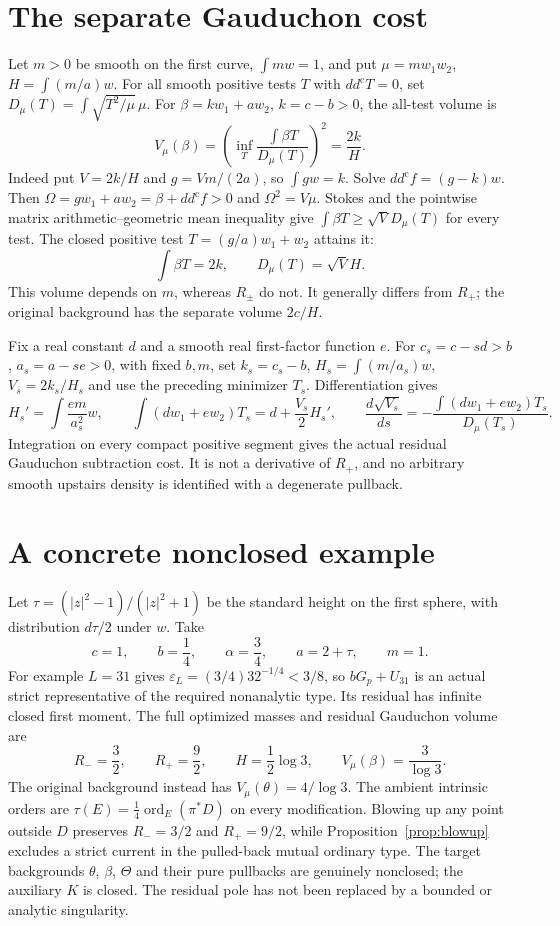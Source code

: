 \documentclass[11pt]{article}
\theoremstyle{remark}
\newcommand{\ddc}{dd^{\mathrm c}}
\begin{document}
\section{The separate Gauduchon cost}
Let $m>0$ be smooth on the first curve, $\int mw=1$, and put
$\mu=mw_1w_2$, $H=\int(m/a)w$. For all smooth positive tests $T$ with
$\ddc T=0$, set $D_\mu(T)=\int\sqrt{T^2/\mu}\,\mu$.
For $\beta=kw_1+aw_2$, $k=c-b>0$, the all-test volume is
\[
 V_\mu(\beta)=\left(\inf_T\frac{\int\beta T}{D_\mu(T)}\right)^2
      =\frac{2k}{H}.
\]
Indeed put $V=2k/H$ and $g=Vm/(2a)$, so $\int gw=k$. Solve
$\ddc f=(g-k)w$. Then $\Omega=gw_1+aw_2=\beta+\ddc f>0$ and
$\Omega^2=V\mu$. Stokes and the pointwise matrix arithmetic--geometric
mean inequality give $\int\beta T\geq\sqrt V D_\mu(T)$ for every test.
The closed positive test $T=(g/a)w_1+w_2$ attains it:
\[
 \int\beta T=2k,\qquad D_\mu(T)=\sqrt V H.
\]
This volume depends on $m$, whereas $R_\pm$ do not. It generally differs
from $R_+$; the original background has the separate volume $2c/H$.

Fix a real constant $d$ and a smooth real first-factor function $e$.
For $c_s=c-sd>b$, $a_s=a-se>0$, with fixed $b,m$, set
$k_s=c_s-b$, $H_s=\int(m/a_s)w$, $V_s=2k_s/H_s$ and use the preceding
minimizer $T_s$. Differentiation gives
\[
 H_s'=\int\frac{em}{a_s^2}w,\qquad
 \int(d w_1+e w_2)T_s=d+\frac{V_s}{2}H_s',\qquad
 \frac{d\sqrt{V_s}}{ds}
   =-\frac{\int(d w_1+e w_2)T_s}{D_\mu(T_s)}.
\]
Integration on every compact positive segment gives the actual residual
Gauduchon subtraction cost. It is not a derivative of $R_+$, and no
arbitrary smooth upstairs density is identified with a degenerate pullback.

\section{A concrete nonclosed example}
Let $\tau=(|z|^2-1)/(|z|^2+1)$ be the standard height on the first
sphere, with distribution $d\tau/2$ under $w$. Take
\[
 c=1,\qquad b=\frac14,\qquad \alpha=\frac34,\qquad
 a=2+\tau,\qquad m=1.
\]
For example $L=31$ gives
$\varepsilon_L=(3/4)32^{-1/4}<3/8$, so $bG_p+U_{31}$ is an actual
strict representative of the required nonanalytic type. Its residual has
infinite closed first moment. The full optimized masses and residual
Gauduchon volume are
\[
 R_-=\frac32,\qquad R_+=\frac92,\qquad
 H=\frac12\log3,\qquad V_\mu(\beta)=\frac3{\log3}.
\]
The original background instead has $V_\mu(\theta)=4/\log3$.
The ambient intrinsic orders are
$\tau(E)=\tfrac14\operatorname{ord}_E(\pi^*D)$ on every modification.
Blowing up any point outside $D$ preserves $R_-=3/2$ and $R_+=9/2$,
while Proposition~\ref{prop:blowup} excludes a strict current in the
pulled-back mutual ordinary type. The target backgrounds $\theta$, $\beta$,
$\Theta$ and their pure pullbacks are genuinely nonclosed; the auxiliary
$K$ is closed. The residual pole has not been replaced by a bounded or
analytic singularity.
\end{document}
